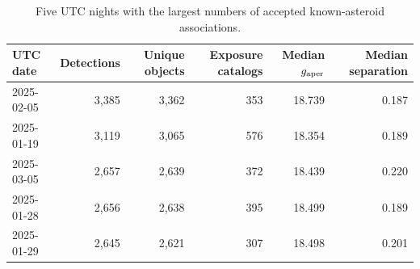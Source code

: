 \begin{table}
\centering
\caption{Five UTC nights with the largest numbers of accepted known-asteroid associations.}
\label{tab:nightly_top5}
\footnotesize
\setlength{\tabcolsep}{6pt}
\renewcommand{\arraystretch}{1.12}
\begin{tabular}{lrrrrr}
\toprule
UTC date & Detections & Unique objects & Exposure catalogs & Median $g_{\rm aper}$ & Median separation \\
\midrule
2025-02-05 & 3,385 & 3,362 & 353 & 18.739 & 0.187 \\
2025-01-19 & 3,119 & 3,065 & 576 & 18.354 & 0.189 \\
2025-03-05 & 2,657 & 2,639 & 372 & 18.439 & 0.220 \\
2025-01-28 & 2,656 & 2,638 & 395 & 18.499 & 0.189 \\
2025-01-29 & 2,645 & 2,621 & 307 & 18.498 & 0.201 \\
\bottomrule
\end{tabular}
\end{table}
